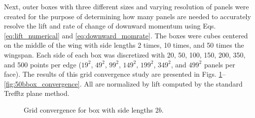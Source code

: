 \documentclass[11pt]{article}
\begin{document}
Next, outer boxes with three different sizes and varying resolution of panels
were created for the purpose of determining how many panels are needed to
accurately resolve the lift and rate of change of downward momentum using Eqs.
\ref{eq:lift_numerical} and \ref{eq:downward_momrate}. The boxes were cubes
centered on the middle of the wing with side lengths 2 times, 10 times, and 50
times the wingspan. Each side of each box was discretized with 20, 50, 100, 150,
200, 350, and 500 points per edge ($19^2$, $49^2$, $99^2$, $149^2$, $199^2$,
$349^2$, and $499^2$ panels per face). The results of this grid convergence study
are presented in Figs. \ref{fig:2bbox_convergence}--\ref{fig:50bbox_convergence}.
All are normalized by lift computed by the standard Trefftz plane method.

\begin{figure}
\centering
\caption{Grid convergence for box with side lengths $2b$.}
\label{fig:2bbox_convergence}
\end{figure}
\end{document}
